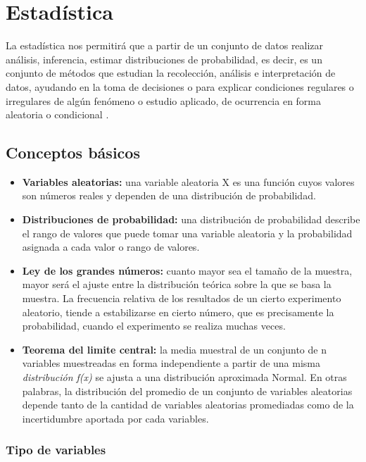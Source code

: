 \documentclass[
]{book}
\begin{document}
\hypertarget{estaduxedstica}{%
\section{Estadística}\label{estaduxedstica}}

La estadística nos permitirá que a partir de un conjunto de datos realizar análisis, inferencia, estimar distribuciones de probabilidad, es decir, es un conjunto de métodos que estudian la recolección, análisis e interpretación de datos, ayudando en la toma de decisiones o para explicar condiciones regulares o irregulares de algún fenómeno o estudio aplicado, de ocurrencia en forma aleatoria o condicional \citep{Wooldridge2010}.

\hypertarget{conceptos-buxe1sicos}{%
\subsection{Conceptos básicos}\label{conceptos-buxe1sicos}}

\begin{itemize}
\item
  \textbf{Variables aleatorias:} una variable aleatoria X es una función cuyos valores son números reales y dependen de una distribución de probabilidad.
\item
  \textbf{Distribuciones de probabilidad:} una distribución de probabilidad describe el rango de valores que puede tomar una variable aleatoria y la probabilidad asignada a cada valor o rango de valores.
\item
  \textbf{Ley de los grandes números:} cuanto mayor sea el tamaño de la muestra, mayor será el ajuste entre la distribución teórica sobre la que se basa la muestra. La frecuencia relativa de los resultados de un cierto experimento aleatorio, tiende a estabilizarse en cierto número, que es precisamente la probabilidad, cuando el experimento se realiza muchas veces.
\item
  \textbf{Teorema del limite central:} la media muestral de un conjunto de n variables muestreadas en forma independiente a partir de una misma \emph{distribución f(x)} se ajusta a una distribución aproximada Normal. En otras palabras, la distribución del promedio de un conjunto de variables aleatorias depende tanto de la cantidad de variables aleatorias promediadas como de la incertidumbre aportada por cada variables.
\end{itemize}

\hypertarget{tipo-de-variables}{%
\subsubsection{Tipo de variables}\label{tipo-de-variables}}
\end{document}
